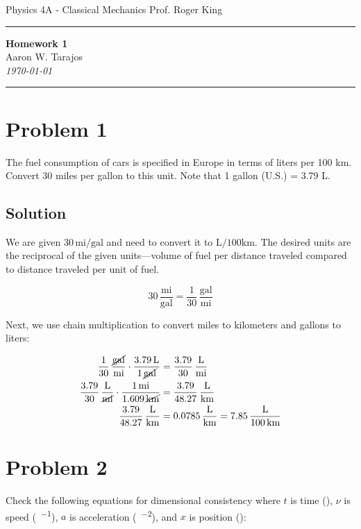\documentclass{article}
\newcommand{\mile}{\text{mi}}
\newcommand{\gallon}{\text{gal}}
\newcommand{\kilo}{\text{k}}
\newcommand{\liter}{\text{L}}
\newcommand{\meter}{\text{m}}
\newcommand{\second}{\text{s}}
\begin{document}
\noindent
Physics 4A - Classical Mechanics \hfill Prof. Roger King

\noindent\rule{\textwidth}{0.4pt}

\begin{center}
    \textbf{\LARGE Homework 1} \\
    \vspace{12pt}
    \large Aaron W. Tarajos \\
    \textit{\today}
\end{center}

\noindent\rule{\textwidth}{0.4pt}

\section*{Problem 1}
The fuel consumption of cars is specified in Europe in terms of liters per 100 km. Convert
30 miles per gallon to this unit. Note that 1 gallon (U.S.) = 3.79 L.

\subsection*{Solution}
We are given \(30 \, \si{\mile\per\gallon}\) and need to convert it to \(\si{\liter\per100\kilo\meter}\). The desired units are the reciprocal of the given units—volume of fuel per distance traveled compared to distance traveled per unit of fuel.

\[
30 \, \frac{\mile}{\gallon} = \frac{1}{30} \, \frac{\gallon}{\mile}
\]

Next, we use chain multiplication to convert miles to kilometers and gallons to liters:

\begin{align*}
\frac{1}{30} \, \frac{\cancel{\gallon}}{\mile} \cdot \frac{3.79 \, \liter}{1 \, \cancel{\gallon}} &= \frac{3.79}{30} \, \frac{\liter}{\mile} \\
\frac{3.79}{30} \, \frac{\liter}{\cancel{\mile}} \cdot \frac{1 \, \mile}{1.609 \, \cancel{\kilo\meter}} &= \frac{3.79}{48.27} \, \frac{\liter}{\kilo\meter} \\
\frac{3.79}{48.27} \, \frac{\liter}{\kilo\meter} &= 0.0785 \, \frac{\liter}{\kilo\meter} = 7.85 \, \frac{\liter}{100 \, \kilo\meter}
\end{align*}

\section*{Problem 2}
Check the following equations for dimensional consistency where \( t \) is time (\si{\second}), \( \nu \) is speed (\si{\meter\per\second}), \( a \) is acceleration (\si{\meter\per\second^2}), and \( x \) is position (\si{\meter}):
\end{document}
